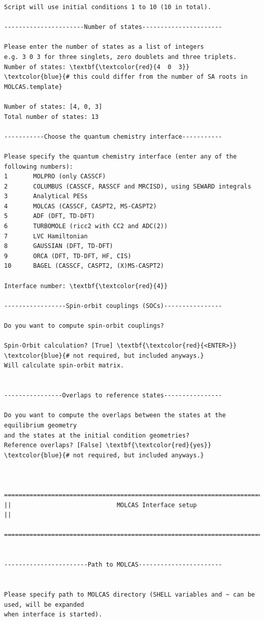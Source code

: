 \documentclass[a4paper,11pt,DIV=15,openany]{scrbook}
\begin{document}
\begin{oframed}
\begin{Verbatim}[commandchars=\\\{\}]
Script will use initial conditions 1 to 10 (10 in total).

----------------------Number of states----------------------

Please enter the number of states as a list of integers
e.g. 3 0 3 for three singlets, zero doublets and three triplets.
Number of states: \textbf{\textcolor{red}{4  0  3}}     \textcolor{blue}{# this could differ from the number of SA roots in MOLCAS.template}

Number of states: [4, 0, 3]
Total number of states: 13

-----------Choose the quantum chemistry interface-----------

Please specify the quantum chemistry interface (enter any of the following numbers):
1       MOLPRO (only CASSCF)
2       COLUMBUS (CASSCF, RASSCF and MRCISD), using SEWARD integrals
3       Analytical PESs
4       MOLCAS (CASSCF, CASPT2, MS-CASPT2)
5       ADF (DFT, TD-DFT)
6       TURBOMOLE (ricc2 with CC2 and ADC(2))
7       LVC Hamiltonian
8       GAUSSIAN (DFT, TD-DFT)
9       ORCA (DFT, TD-DFT, HF, CIS)
10      BAGEL (CASSCF, CASPT2, (X)MS-CASPT2)

Interface number: \textbf{\textcolor{red}{4}}

-----------------Spin-orbit couplings (SOCs)----------------

Do you want to compute spin-orbit couplings?

Spin-Orbit calculation? [True] \textbf{\textcolor{red}{<ENTER>}}     \textcolor{blue}{# not required, but included anyways.}
Will calculate spin-orbit matrix.


----------------Overlaps to reference states----------------

Do you want to compute the overlaps between the states at the equilibrium geometry 
and the states at the initial condition geometries?
Reference overlaps? [False] \textbf{\textcolor{red}{yes}}    \textcolor{blue}{# not required, but included anyways.}


  ================================================================================
||                             MOLCAS Interface setup                             ||
  ================================================================================


-----------------------Path to MOLCAS-----------------------


Please specify path to MOLCAS directory (SHELL variables and ~ can be used, will be expanded 
when interface is started).


\end{Verbatim}
\end{oframed}
\end{document}
